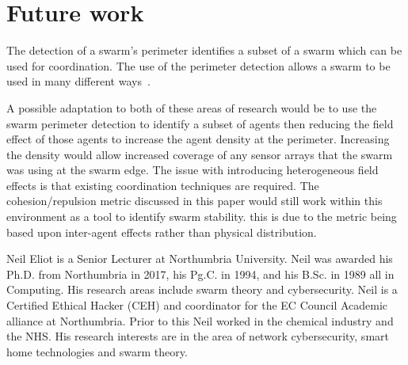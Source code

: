 \documentclass{ieeeaccess}
\begin{document}
\section{Future work\label{metric:Future}}
The detection of a swarm's perimeter \cite{MD:09, MJ:08, ZAPS:07, JG:13} identifies a subset of a swarm which can be used for coordination. The use of the perimeter detection allows a swarm to be used in many different ways~\cite{ZFG:13, AKK:08, APZDAMC:09, AZDPS:11}. 

A possible adaptation to both of these areas of research would be to use the swarm perimeter detection to identify a subset of agents then reducing the field effect of those agents to increase the agent density at the perimeter. Increasing the density would allow increased coverage of any sensor arrays that the swarm was using at the swarm edge. The issue with introducing heterogeneous field effects is that existing coordination techniques are required. The cohesion/repulsion metric discussed in this paper would still work within this environment as a tool to identify swarm stability. this is due to the metric being based upon inter-agent effects rather than physical distribution. 




\begin{IEEEbiography}{Neil Eliot}
is a Senior Lecturer at Northumbria University.  Neil was awarded his Ph.D. from Northumbria in 2017, his Pg.C. in 1994, and his B.Sc. in 1989 all in Computing. His research areas include swarm theory and cybersecurity. Neil is a Certified Ethical Hacker (CEH) and coordinator for the EC Council Academic alliance at Northumbria. Prior to this Neil worked in the chemical industry and the NHS. His research interests are in the area of network cybersecurity, smart home technologies and swarm theory. 
\end{IEEEbiography}
\end{document}
